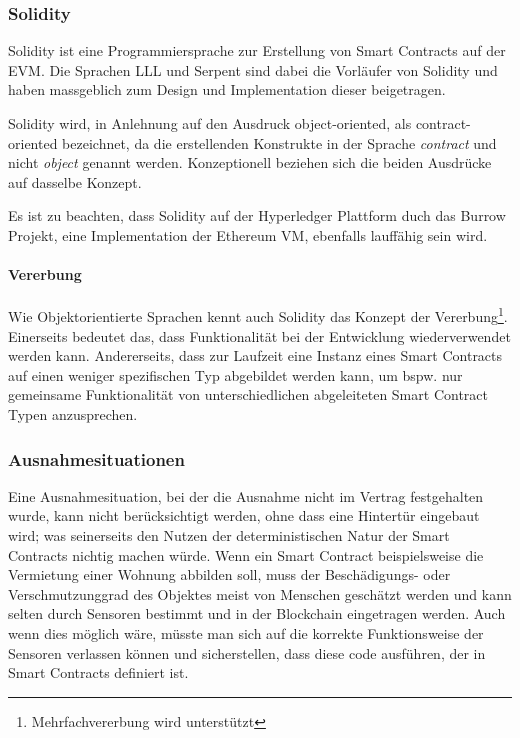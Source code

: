 \subsubsection{Solidity}
\label{subsubsec:Solidity}
Solidity ist eine Programmiersprache zur Erstellung von Smart Contracts auf der \acrshort{EVM}. Die Sprachen \acrfull{LLL} und Serpent sind dabei die Vorläufer von Solidity und haben massgeblich zum Design und Implementation dieser beigetragen.\cite[issues/175]{cpp-ethereum}\cite[solidity]{ethereum}

Solidity wird, in Anlehnung auf den Ausdruck object-oriented, als contract-oriented bezeichnet, da die erstellenden Konstrukte in der Sprache \emph{contract} und nicht \emph{object} genannt werden. Konzeptionell beziehen sich die beiden Ausdrücke auf dasselbe Konzept.

Es ist zu beachten, dass Solidity auf der Hyperledger Plattform duch das Burrow Projekt, eine Implementation der Ethereum VM, ebenfalls lauffähig sein wird.\cite{github.com/hyperledger/burrow}

\paragraph{Vererbung}
\label{para:Vererbung}
Wie Objektorientierte Sprachen kennt auch Solidity das Konzept der Vererbung\footnote{Mehrfachvererbung wird unterstützt}. Einerseits bedeutet das, dass Funktionalität bei der Entwicklung wiederverwendet werden kann. Andererseits, dass zur Laufzeit eine Instanz eines Smart Contracts auf einen weniger spezifischen Typ abgebildet werden kann, um bspw. nur gemeinsame Funktionalität von unterschiedlichen abgeleiteten Smart Contract Typen anzusprechen.


\subsubsection{Ausnahmesituationen}
Eine Ausnahmesituation, bei der die Ausnahme nicht im Vertrag festgehalten wurde, kann nicht berücksichtigt werden, ohne dass eine Hintertür eingebaut wird; was seinerseits den Nutzen der deterministischen Natur der Smart Contracts nichtig machen würde.
Wenn ein Smart Contract beispielsweise die Vermietung einer Wohnung abbilden soll, muss der Beschädigungs- oder Verschmutzunggrad des Objektes meist von Menschen geschätzt werden und kann selten durch Sensoren bestimmt und in der Blockchain eingetragen werden. Auch wenn dies möglich wäre, müsste man sich auf die korrekte Funktionsweise der Sensoren verlassen können und sicherstellen, dass diese code ausführen, der in Smart Contracts definiert ist.\cite{ibtimes.co.uk/abiguity}
